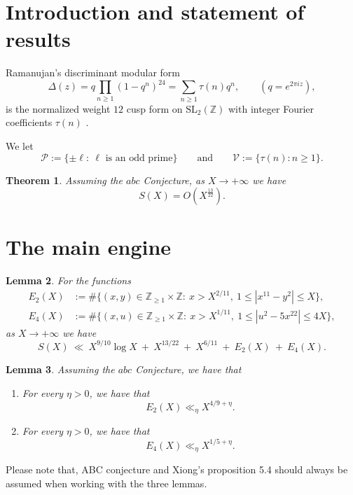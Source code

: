 \documentclass[12pt]{amsart}
\newtheorem{theorem}{Theorem}
\newtheorem{lemma}[theorem]{Lemma}
\theoremstyle{remark}
\numberwithin{equation}{section}
\begin{document}
\section{Introduction and statement of results}

Ramanujan's discriminant modular form
\begin{equation}\label{eq:delta}
\Delta(z)=q\prod_{n\ge 1}(1-q^n)^{24}=\sum_{n\ge 1}\tau(n)q^n,\qquad (q=e^{2\pi i z}),
\end{equation}
is the normalized weight $12$ cusp form on $\mathrm{SL}_2(\mathbb Z)$ with integer Fourier coefficients
$\tau(n)$ \cite{Ramanujan1916}.

We let
\begin{equation}
\mathcal P:=\{\pm \ell:\ \ell \text{ is an odd prime}\}
\qquad  {\text {and}} \qquad
\mathcal V:=\{\tau(n):n\ge 1\}.
\end{equation}

\begin{theorem}\label{thm:main}
Assuming the $abc$ Conjecture, as $X\rightarrow +\infty$ we have
$$
S(X) = O(X^{\frac{13}{22}}).
$$
\end{theorem}

\section{The main engine}

\begin{lemma}\label{lem:reduction}
For the functions
\begin{displaymath}
\begin{split}
E_2(X)&:=\#\{(x,y)\in\mathbb Z_{\ge 1}\times\mathbb Z:\ x> X^{2/11},\ 1\le |x^{11}-y^2|\le X\},\\
E_4(X)&:=\#\{(x,u)\in\mathbb Z_{\ge 1}\times\mathbb Z:\ x> X^{1/11},\ 1\le |u^2-5x^{22}|\le 4X\},
\end{split}
\end{displaymath}
as $X\rightarrow +\infty$ we have
\[
S(X)\ \ll\ X^{9/10}\log X\ +\ X^{13/22}\ +\ X^{6/11}\ +\ E_2(X)\ +\ E_4(X).
\]
\end{lemma}

\begin{lemma}\label{lem:main_engine}
Assuming the $abc$ Conjecture, we have that
\begin{enumerate}
\item[(i)] For every $\eta>0$, we have that
$$E_2(X)\ll_{\eta} X^{4/9+\eta}.
$$
\item[(ii)] For every $\eta>0$, we have that
$$E_4(X)\ll_{\eta} X^{1/5+\eta}.
$$
\end{enumerate}
\end{lemma}

Please note that, ABC conjecture and Xiong's proposition 5.4 should always be assumed when working with the three lemmas.
\end{document}

